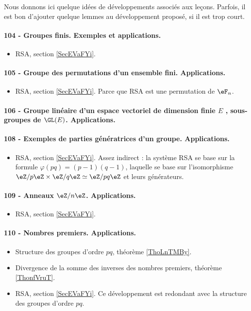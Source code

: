 Nous donnons ici quelque idées de développements associés aux leçons. Parfois, il est bon d'ajouter quelque lemmes au développement proposé, si il est trop court.


\paragraph{104 - Groupes finis. Exemples et applications.}
\begin{itemize}
    \item RSA, section \ref{SecEVaFYi}.
\end{itemize}
\paragraph{105 - Groupe des permutations d’un ensemble fini. Applications.}
\begin{itemize}
    \item RSA, section \ref{SecEVaFYi}. Parce que RSA est une permutation de \( \eF_n\).
\end{itemize}
\paragraph{106 - Groupe linéaire d’un espace vectoriel de dimension finie $E$ , sous-groupes de $\GL(E)$. Applications.}
\paragraph{108 - Exemples de parties génératrices d’un groupe. Applications.}
\begin{itemize}
    \item RSA, section \ref{SecEVaFYi}. Assez indirect : la système RSA se base sur la formule \( \varphi(pq)=(p-1)(q-1)\), laquelle se base sur l'isomorphisme \( \eZ/p\eZ\times \eZ/q\eZ\simeq \eZ/pq\eZ\) et leurs générateurs.
\end{itemize}
\paragraph{109 - Anneaux $\eZ/n\eZ$. Applications.}
\begin{itemize}
    \item RSA, section \ref{SecEVaFYi}.
\end{itemize}

\paragraph{110 - Nombres premiers. Applications.}
\begin{itemize}
    \item Structure des groupes d'ordre \( pq\), théorème \ref{ThoLnTMBy}.
    \item Divergence de la somme des inverses des nombres premiers, théorème \ref{ThonfVruT}.
    \item RSA, section \ref{SecEVaFYi}. Ce développement est redondant avec la structure des groupes d'ordre \( pq\).
\end{itemize}

